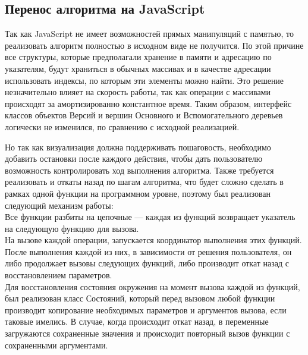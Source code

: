 \documentclass[a4paper,12pt]{extarticle}
\begin{document}
\subsection{Перенос алгоритма на JavaScript}
Так как JavaScript не имеет возможностей прямых манипуляций с памятью, то реализовать алгоритм полностью в исходном виде не получится. По этой причине все структуры, которые предполагали хранение в памяти и адресацию по указателям, будут храниться в обычных массивах и в качестве адресации использовать индексы, по которым эти элементы можно найти. Это решение незначительно влияет на скорость работы, так как операции с массивами происходят за амортизированно константное время. Таким образом, интерфейс классов объектов Версий и вершин Основного и Вспомогательного деревьев логически не изменился, по сравнению с исходной реализацией.\par
Но так как визуализация должна поддерживать пошаговость, необходимо добавить остановки после каждого действия, чтобы дать пользователю возможность контролировать ход выполнения алгоритма. Также требуется реализовать и откаты назад по шагам алгоритма, что будет сложно сделать в рамках одной функции на программном уровне, поэтому был реализован следующий механизм работы:\\
Все функции разбиты на цепочные — каждая из функций возвращает указатель на следующую функцию для вызова.\\
На вызове каждой операции, запускается координатор выполнения этих функций. После выполнения каждой из них, в зависимости от решения пользователя, он либо продолжает вызовы следующих функций, либо производит откат назад с восстановлением параметров.\\
Для восстановления состояния окружения на момент вызова каждой из функций, был реализован класс Состояний, который перед вызовом любой функции производит копирование необходимых параметров и аргументов вызова, если таковые имелись. В случае, когда происходит откат назад, в переменные загружаются сохраненные значения и происходит повторный вызов функции с сохраненными аргументами.
\end{document}
